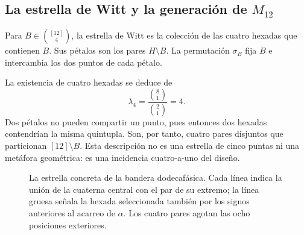 

\subsection{La estrella de Witt y la generación de \texorpdfstring{$M_{12}$}{M12}}
\label{exc:estrella}

\begin{definition}
\label{exc:def-estrella}
Para $B\in\binom{[12]}4$, la estrella de Witt es la colección de las
cuatro hexadas que contienen $B$. Sus pétalos son los pares $H\setminus B$.
La permutación $\sigma_B$ fija $B$ e intercambia los dos puntos de cada
pétalo.
\end{definition}

La existencia de cuatro hexadas se deduce de
\[
 \lambda_4=\frac{\binom81}{\binom21}=4.
\]
Dos pétalos no pueden compartir un punto, pues entonces dos hexadas
contendrían la misma quintupla. Son, por tanto, cuatro pares disjuntos
que particionan $[12]\setminus B$. Esta descripción no es una estrella
de cinco puntas ni una metáfora geométrica: es una incidencia
cuatro-a-uno del diseño.

\begin{figure}[htbp]
\centering
{}
\caption{La estrella concreta de la bandera dodecafásica. Cada línea
indica la unión de la cuaterna central con el par de su extremo; la
línea gruesa señala la hexada seleccionada también por los signos
anteriores al acarreo de $\alpha$. Los cuatro pares agotan las ocho
posiciones exteriores.}
\label{exc:fig-estrella}
\end{figure}

